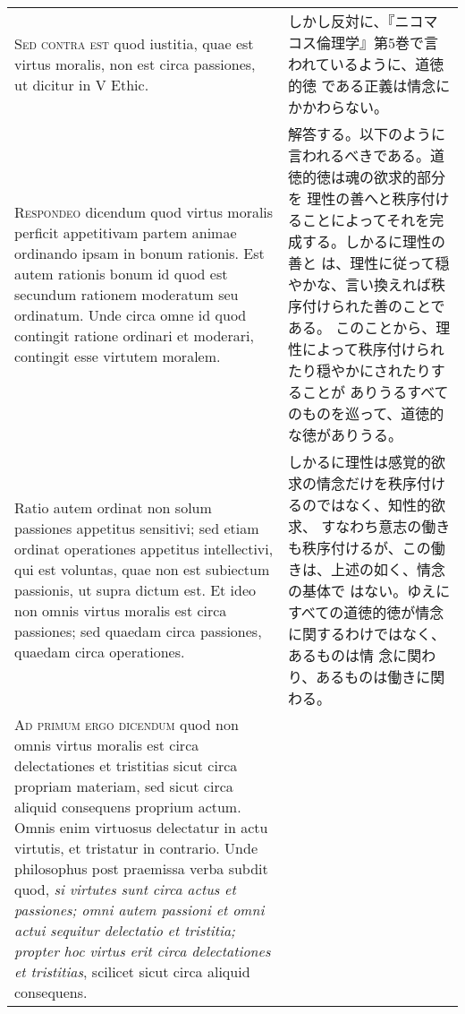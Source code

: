 \documentclass[10pt]{jsarticle}
\begin{document}
\begin{longtable}{p{21em}p{21em}}
\\



{\scshape Sed contra est} quod iustitia, quae est virtus moralis, non
est circa passiones, ut dicitur in V Ethic.

&

しかし反対に、『ニコマコス倫理学』第5巻で言われているように、道徳的徳
である正義は情念にかかわらない。
 
\\



{\scshape Respondeo} dicendum quod virtus moralis perficit appetitivam
partem animae ordinando ipsam in bonum rationis. Est autem rationis
bonum id quod est secundum rationem moderatum seu ordinatum.  Unde
circa omne id quod contingit ratione ordinari et moderari, contingit
esse virtutem moralem.
 
&

 解答する。以下のように言われるべきである。道徳的徳は魂の欲求的部分を
 理性の善へと秩序付けることによってそれを完成する。しかるに理性の善と
 は、理性に従って穏やかな、言い換えれば秩序付けられた善のことである。
 このことから、理性によって秩序付けられたり穏やかにされたりすることが
 ありうるすべてのものを巡って、道徳的な徳がありうる。

 
\\

Ratio autem ordinat non solum
passiones appetitus sensitivi; sed etiam ordinat operationes appetitus
intellectivi, qui est voluntas, quae non est subiectum passionis, ut
supra dictum est. Et ideo non omnis virtus moralis est circa
passiones; sed quaedam circa passiones, quaedam circa operationes.

&

しかるに理性は感覚的欲求の情念だけを秩序付けるのではなく、知性的欲求、
すなわち意志の働きも秩序付けるが、この働きは、上述の如く、情念の基体で
はない。ゆえにすべての道徳的徳が情念に関するわけではなく、あるものは情
念に関わり、あるものは働きに関わる。
 
\\



{\scshape Ad primum ergo dicendum} quod non omnis virtus moralis est
circa delectationes et tristitias sicut circa propriam materiam, sed
sicut circa aliquid consequens proprium actum. Omnis enim virtuosus
delectatur in actu virtutis, et tristatur in contrario. Unde
philosophus post praemissa verba subdit quod, {\itshape si virtutes
sunt circa actus et passiones; omni autem passioni et omni actui
sequitur delectatio et tristitia; propter hoc virtus erit circa
delectationes et tristitias}, scilicet sicut circa aliquid consequens.


\end{longtable}
\end{document}
